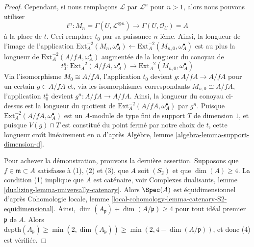 \begin{proof}
\medskip\noindent
Cependant, si nous remplaçons $\mathcal{L}$ par $\mathcal{L}^n$ pour $n > 1$,
alors nous pouvons utiliser
$$
t^n :
M_n = \Gamma(U, \mathcal{L}^{\otimes n})
\longrightarrow
\Gamma(U, \mathcal{O}_U) = A
$$
à la place de $t$. Ceci remplace $t_0$ par sa puissance $n$-ième.
Ainsi, la longueur de l'image de l'application
$\text{Ext}^{-2}_A(M_n, \omega_A^\bullet) \leftarrow
\text{Ext}^{-2}_A(M_{n, 0}, \omega_A^\bullet)$
est au plus la longueur de $\text{Ext}^{-2}_A(A/fA, \omega_A^\bullet)$
augmentée de la longueur du conoyau de
$$
t_0^n : 
\text{Ext}^{-2}_A(A/fA, \omega_A^\bullet)
\longrightarrow
\text{Ext}^{-2}_A(M_{n, 0}, \omega_A^\bullet)
$$
Via l'isomorphisme $M_0 \cong A/fA$, l'application $t_0$ devient
$g : A/fA \to A/fA$ pour un certain $g \in A/fA$ et, via les isomorphismes
correspondants $M_{n, 0} \cong A/fA$, l'application $t_0^n$ devient
$g^n : A/fA \to A/fA$. Ainsi, la longueur du conoyau ci-dessus
est la longueur du quotient de
$\text{Ext}^{-2}_A(A/fA, \omega_A^\bullet)$ par $g^n$.
Puisque $\text{Ext}^{-2}_A(A/fA, \omega_A^\bullet)$ est un $A$-module de type fini
de support $T$ de dimension $1$, et puisque $V(g) \cap T$
est constitué du point fermé par notre choix de $t$,
cette longueur croît linéairement en $n$ d'après
Algèbre, lemme \ref{algebra-lemma-support-dimension-d}.

\medskip\noindent
Pour achever la démonstration, prouvons la dernière assertion. Supposons que
$f \in \mathfrak m \subset A$ satisfasse
à (1), (2) et (3), que $A$ soit $(S_2)$ et que $\dim(A) \geq 4$.
La condition (1) implique que $A$ est caténaire, voir
Complexes dualisants, lemme \ref{dualizing-lemma-universally-catenary}.
Alors $\Spec(A)$ est équidimensionnel d'après Cohomologie locale, lemme
\ref{local-cohomology-lemma-catenary-S2-equidimensional}.
Ainsi, $\dim(A_\mathfrak p) + \dim(A/\mathfrak p) \geq 4$
pour tout idéal premier $\mathfrak p$ de $A$. Alors
$\text{depth}(A_\mathfrak p) \geq \min(2, \dim(A_\mathfrak p))
\geq \min(2, 4 - \dim(A/\mathfrak p))$, et donc (4) est vérifiée.
\end{proof}

